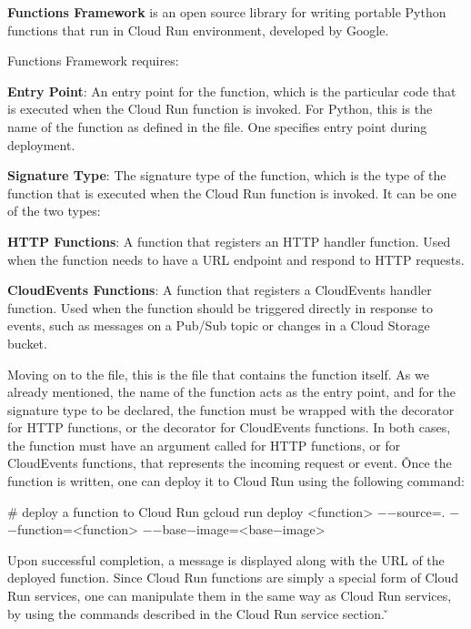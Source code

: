 \textbf{Functions Framework} is an open source library for writing portable Python functions that run in Cloud Run
environment, developed by Google.
\ed

Functions Framework requires:
\bit
\item \textbf{Entry Point}: An entry point for the function, which is the particular code that is executed when
the Cloud Run function is invoked. For Python, this is the name of the function as defined in the  file.
One specifies  entry point during deployment.
\item \textbf{Signature Type}: The signature type of the function, which is the type of the function that is executed
when the Cloud Run function is invoked. It can be one of the two types:
\bit
\item \textbf{HTTP Functions}: A function that registers an HTTP handler function. Used when the function needs to
have a URL endpoint and respond to HTTP requests.
\item \textbf{CloudEvents Functions}: A function that registers a CloudEvents handler function. Used when the function
should be triggered directly in response to events, such as messages on a Pub/Sub topic or changes in a Cloud Storage
bucket.
\eit
\eit

Moving on to the  file, this is the file that contains the function itself. As we already mentioned,
the name of the function acts as the entry point, and for the signature type to be declared, the function must be
wrapped with the  decorator for HTTP functions, or the
 decorator for CloudEvents functions. In both cases, the function must have
an argument called  for HTTP functions, or  for CloudEvents functions, that
represents the incoming request or event. \v

Once the function is written, one can deploy it to Cloud Run using the following command:
\begin{bash}
# deploy a function to Cloud Run
gcloud run deploy <function> $-$$-$source=. $-$$-$function=<function> $-$$-$base$-$image=<base$-$image>
\end{bash}

Upon successful completion, a message is displayed along with the URL of the deployed function. Since Cloud Run
functions are simply a special form of Cloud Run services, one can manipulate them in the same way as Cloud Run
services, by using the commands described in the Cloud Run service section. \v

